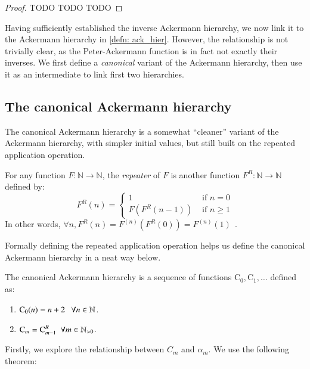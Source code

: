 \begin{proof}
TODO TODO TODO
\end{proof}

Having sufficiently established the inverse Ackermann 
hierarchy, we now link it to the Ackermann hierarchy 
in \cref{defn: ack_hier}. However, the relationship is 
not trivially clear, as the Peter-Ackermann function is 
in fact not exactly {\color{magenta}their inverses.} 
We first define a \textit{canonical} variant of the 
Ackermann hierarchy, then use it as an intermediate to 
link first two hierarchies.

\subsection{The canonical Ackermann hierarchy}

The canonical Ackermann hierarchy is a somewhat ``cleaner'' 
variant of the Ackermann hierarchy, with simpler initial 
values, but still built on the repeated application operation.

\begin{defn} \label{defn: rep_app}
For any function $F: \mathbb{N} \to \mathbb{N}$, the 
\textit{repeater} of $F$ is another function $F^R : 
\mathbb{N} \to \mathbb{N}$ defined by:
\begin{equation}
F^R(n) = \begin{cases}
1 & \text{ if } n = 0 \\ F\left(F^R(n - 1)\right) & \text{ if } n \ge 1
\end{cases}
\end{equation}
In other words, $\forall n, F^R(n) = F^{(n)}\left(F^R(0)\right) = F^{(n)}(1) \ \ $.
\end{defn}

Formally defining the repeated application operation 
helps us define the canonical Ackermann hierarchy in 
a neat way below.

\begin{defn} \label{defn: can_ack_hier}
The canonical Ackermann hierarchy is a sequence of 
functions $\text{C}_0, \text{C}_1, \ldots $ defined as:
\begin{enumerate}
	\item $\text{C}_0(n) = n + 2 \ \ \ \forall n\in \mathbb{N}$.
	\item $\text{C}_m = \text{C}_{m-1}^R \ \ \forall m\in \mathbb{N}_{>0}$.
\end{enumerate}
\end{defn}

Firstly, we explore the relationship between $C_m$ and 
$\alpha_m$. We use the following theorem:

